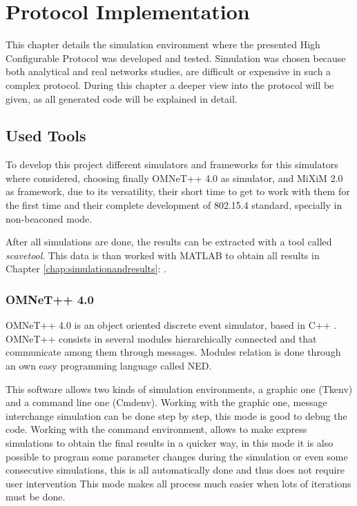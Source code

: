 \chapter{Protocol Implementation}
\label{chap:protocolimplementation}

This chapter details the simulation environment where the presented High Configurable Protocol was developed and tested. Simulation was chosen because
both analytical and real networks studies, are difficult or expensive in such a complex protocol. During this chapter a deeper view into the protocol will
be given, as all generated code will be explained in detail.

\section{Used Tools}

To develop this project different simulators and frameworks for this simulators where considered, choosing finally \ac{OMNeT++} 4.0 \cite{OMNeT}
as simulator, and \ac{MiXiM} 2.0 \cite{MiXiM} as framework, due to its versatility, their short time to get to work with them for the first time and 
their complete development of 802.15.4 standard, specially in non-beaconed mode.

After all simulations are done, the results can be extracted with a tool called \textit{scavetool}. This data is than worked with \ac{MATLAB} 
\cite{MATLAB} to obtain all results in Chapter \ref{chap:simulationandresults}: .

\subsection{\ac{OMNeT++} 4.0}

\ac{OMNeT++} 4.0 is an object oriented discrete event simulator, based in C++ \cite{cpp}. \ac{OMNeT++} consists in several modules hierarchically
connected and that communicate among them through messages. Modules relation is done through an own easy programming language called \ac{NED}.

This software allows two kinds of simulation environments, a graphic one (Tkenv) and a command line one (Cmdenv). Working with the graphic one, 
message interchange simulation can be done step by step, this mode is good to debug the code. Working with the command environment, allows to
make express simulations to obtain the final results in a quicker way, in this mode it is also possible to program some
parameter changes during the simulation or even some consecutive simulations, this is all automatically done and thus does not require user 
intervention This mode makes all process much easier when lots of iterations must be done.

